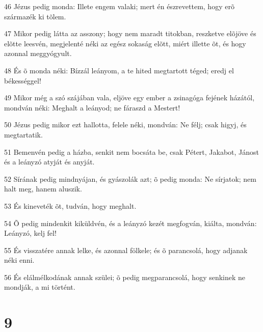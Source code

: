 \par 46 Jézus pedig monda: Illete engem valaki; mert én észrevettem, hogy erõ származék ki tõlem.
\par 47 Mikor pedig látta az asszony; hogy nem maradt titokban, reszketve elõjöve és elõtte leesvén, megjelenté néki az egész sokaság elõtt, miért illette õt, és hogy azonnal meggyógyult.
\par 48 És õ monda néki: Bízzál leányom, a te hited megtartott téged; eredj el békességgel!
\par 49 Mikor még a szó szájában vala, eljöve egy ember a zsinagóga fejének házától, mondván néki: Meghalt a leányod; ne fáraszd a Mestert!
\par 50 Jézus pedig mikor ezt hallotta, felele néki, mondván: Ne félj; csak higyj, és megtartatik.
\par 51 Bemenvén pedig a házba, senkit nem bocsáta be, csak Pétert, Jakabot, Jánost és a leányzó atyját és anyját.
\par 52 Sírának pedig mindnyájan, és gyászolák azt; õ pedig monda: Ne sírjatok; nem halt meg, hanem aluszik.
\par 53 És kineveték õt, tudván, hogy meghalt.
\par 54 Õ pedig mindenkit kiküldvén, és a leányzó kezét megfogván, kiálta, mondván: Leányzó, kelj fel!
\par 55 És visszatére annak lelke, és azonnal fölkele; és õ parancsolá, hogy adjanak néki enni.
\par 56 És elálmélkodának annak szülei; õ pedig megparancsolá, hogy senkinek ne mondják, a mi történt.

\chapter{9}

